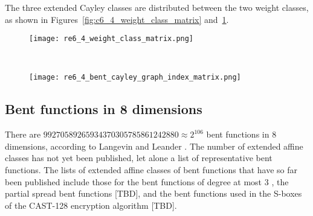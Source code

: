 \documentclass[12pt,a4paper]{article}
\begin{document}

The three extended Cayley classes are distributed between the two weight classes,
as shown in Figures~\ref{fig:c6_4_weight_class_matrix} and~\ref{fig:c6_4_bent_cayley_graph_index_matrix}.

\begin{figure}[!hpt] %
\centering
\begin{minipage}{.48\textwidth}
  \centering
  \texttt{[image: re6\_4\_weight\_class\_matrix.png]}
  \label{fig:c6_4_weight_class_matrix}
\end{minipage}%
~~~~
\begin{minipage}{.48\textwidth}
  \centering
  \texttt{[image: re6\_4\_bent\_cayley\_graph\_index\_matrix.png]}
  \label{fig:c6_4_bent_cayley_graph_index_matrix}
\end{minipage}
\end{figure}
\subsection{Bent functions in 8 dimensions}

There are
$99 270 589 265 934 370 305 785 861 242 880 \approx 2^{106}$ bent functions in 8 dimensions,
according to Langevin and Leander \cite{LanL11counting}.
%
%
The number of extended affine classes has not yet been published,
let alone a list of representative bent functions.
The lists of extended affine classes of bent functions that have so far been published include those
for the bent functions of degree at most 3 \cite[Section 5.5.2]{Bra06thesis} \cite[Section 7.3]{Tok15bent},
the partial spread bent functions \cite{LanH11counting} [TBD],
and the bent functions used in the S-boxes of the CAST-128 encryption algorithm \cite{Ada97} [TBD].
\end{document}
